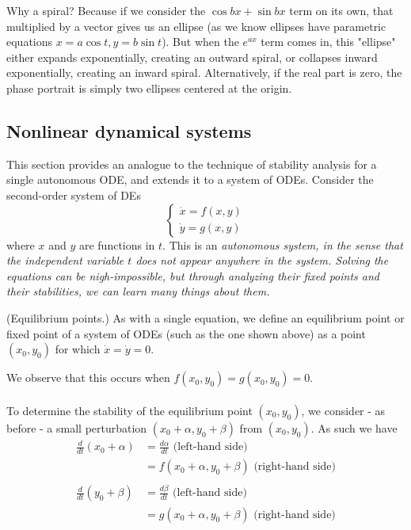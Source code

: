 \documentclass{article}
\begin{document}
Why a spiral? Because if we consider the $\cos bx + \sin bx$ term on its own, that multiplied by a vector gives us an ellipse (as we know ellipses have parametric equations $x=a\cos t, y=b\sin t$). But when the $e^{ax}$ term comes in, this "ellipse" either expands exponentially, creating an outward spiral, or collapses inward exponentially, creating an inward spiral. Alternatively, if the real part is zero, the phase portrait is simply two ellipses centered at the origin.
\subsection{Nonlinear dynamical systems}
This section provides an analogue to the technique of stability analysis for a single autonomous ODE, and extends it to a system of ODEs. Consider the second-order system of DEs 
\begin{equation*}
    \begin{cases}
        \dot{x}=f(x,y)\\
        \dot{y}=g(x,y)
    \end{cases}
\end{equation*}
where $x$ and $y$ are functions in $t$. This is an \it autonomous \normalfont system, in the sense that the independent variable $t$ does not appear anywhere in the system. Solving the equations can be nigh-impossible, but through analyzing their fixed points and their stabilities, we can learn many things about them. 
\begin{definition}
    (Equilibrium points.) As with a single equation, we define an equilibrium point or fixed point of a system of ODEs (such as the one shown above) as a point $(x_0,y_0)$ for which $\dot{x}=\dot{y}=0$. 
\end{definition}
We observe that this occurs when $f(x_0,y_0)=g(x_0,y_0) = 0$.\\ \\
To determine the stability of the equilibrium point $(x_0,y_0)$, we consider - as before - a small perturbation $(x_0+\alpha, y_0+\beta)$ from $(x_0,y_0)$. As such we have
\begin{equation*}
    \begin{aligned}
        \frac{d}{dt}(x_0+\alpha)&=\frac{d\alpha}{dt}\text{ (left-hand side)} \\
        &=f(x_0+\alpha, y_0+\beta)\text{ (right-hand side)} \\ \\
        \frac{d}{dt}(y_0+\beta)&=\frac{d\beta}{dt}\text{ (left-hand side)} \\
        &=g(x_0+\alpha, y_0+\beta)\text{ (right-hand side)}
    \end{aligned}
\end{equation*}
\end{document}
